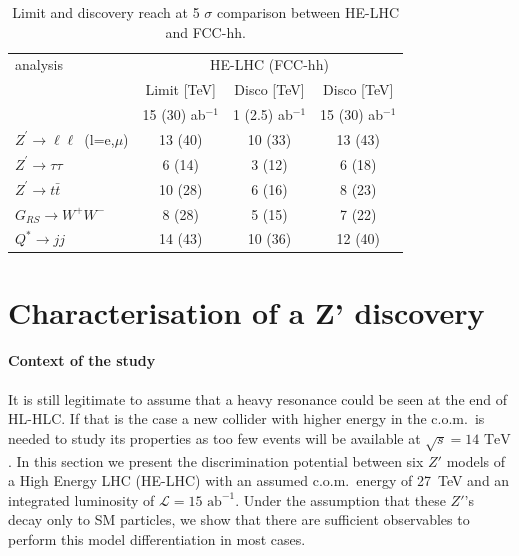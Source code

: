 \documentclass[a4paper,11pt]{article}
\newcommand*{\Zptata}{\ensuremath{Z^{\prime}\rightarrow \tau\tau}}
\newcommand*{\Zpmumu}{\ensuremath{Z^{\prime}\rightarrow \mu\mu}}
\newcommand*{\Zpll}{\ensuremath{Z^{\prime}\rightarrow \ell\ell}}
\newcommand*{\Zptt}{\ensuremath{Z^{\prime} \rightarrow \ttbar}}
\newcommand*{\intlumihelhc}{\ensuremath{\mathcal{L}=15\text{ ab}^{-1}}}
\newcommand*{\qjj}{\ensuremath{Q^{*} \rightarrow jj}}
\newcommand*{\rsg}{\ensuremath{G_{RS} \rightarrow W^+W^-}}
\newcommand*{\ttbar}{\ensuremath{t\bar{t}}}
\newcommand*{\com}{c.o.m.~}
\begin{document}
\begin{table}[!htb]\centering
\begin{tabular}{|l|c|c|c|}
\hline
\hline
analysis   & \multicolumn{3}{c|}{HE-LHC (FCC-hh)} \\
           & Limit [TeV] & Disco [TeV]   & Disco [TeV] \\
           &  15 (30) ab$^{-1}$ & 1 (2.5) ab$^{-1}$ & 15 (30) ab$^{-1}$ \\
\hline
\Zpll\ (l=e,$\mu$) & 13 (40) & 10 (33) & 13 (43) \\
\Zptata       &  6 (14) &  3 (12) &  6 (18) \\
\Zptt         & 10 (28) &  6 (16) &  8 (23) \\
\rsg          &  8 (28) &  5 (15) &  7 (22) \\
\qjj          & 14 (43) & 10 (36) & 12 (40) \\
\hline
\hline
\end{tabular}
\caption{Limit and discovery reach at 5 $\sigma$ comparison between HE-LHC and FCC-hh.}
\label{tab:27vs100}
\end{table}




\section{Characterisation of a Z' discovery}
\label{sec:zprimedisc}

\newcommand*{\sqrtslhc}{\ensuremath{\sqrt{s}=\text{14 TeV}}}
\newcommand*{\sqrtshelhc}{\ensuremath{\sqrt{s}=\text{27 TeV}}}
\renewcommand*{\intlumihelhc}{\ensuremath{\mathcal{L}=15\text{ ab}^{-1}}}
\newcommand*{\intlumihllhc}{\ensuremath{\mathcal{L}=3\text{ ab}^{-1}}}


\paragraph*{Context of the study}
It is still legitimate to assume that a heavy resonance could be seen at the end of HL-HLC. If that is the case a new collider with higher energy
in the \com is needed to study its properties as too few events will be available at \sqrtslhc. In this section we present the discrimination potential between six $Z'$ models of a High Energy LHC (HE-LHC) with an assumed \com energy of 27~TeV and an integrated luminosity of \intlumihelhc. Under the assumption that these $Z'$'s decay only to SM particles, we show that there are sufficient observables to perform this model differentiation in most cases.
\end{document}
